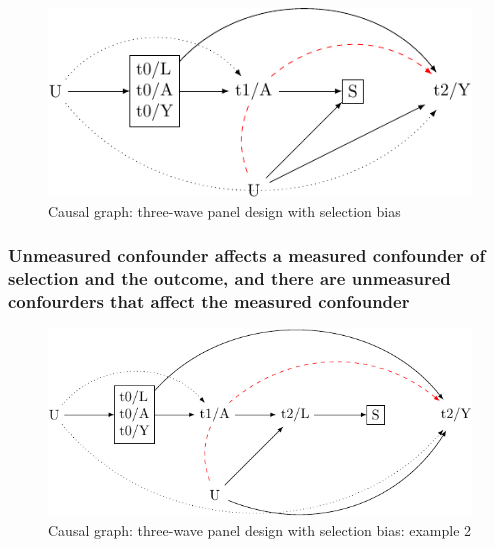 \documentclass[
  singlecolumn]{report}
\begin{document}
\begin{figure}

{\centering \includegraphics[width=1\textwidth,height=\textheight]{causal-dags_files/figure-pdf/fig-dag-8-1.pdf}

}

\caption{\label{fig-dag-8}Causal graph: three-wave panel design with
selection bias}

\end{figure}

\hypertarget{unmeasured-confounder-affects-a-measured-confounder-of-selection-and-the-outcome-and-there-are-unmeasured-confourders-that-affect-the-measured-confounder}{%
\subsubsection{Unmeasured confounder affects a measured confounder of
selection and the outcome, and there are unmeasured confourders that
affect the measured
confounder}\label{unmeasured-confounder-affects-a-measured-confounder-of-selection-and-the-outcome-and-there-are-unmeasured-confourders-that-affect-the-measured-confounder}}

\begin{figure}

{\centering \includegraphics[width=1\textwidth,height=\textheight]{causal-dags_files/figure-pdf/fig-dag-8-2-1.pdf}

}

\caption{\label{fig-dag-8-2}Causal graph: three-wave panel design with
selection bias: example 2}

\end{figure}
\end{document}
